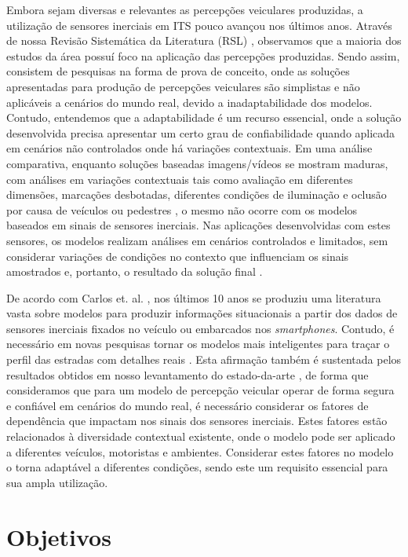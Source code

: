 Embora sejam diversas e relevantes as percepções veiculares produzidas, a utilização de sensores inerciais em ITS pouco avançou nos últimos anos. Através de nossa Revisão Sistemática da Literatura (RSL) \cite{menegazzo2018,menegazzo2020}, observamos que a maioria dos estudos da área possuí foco na aplicação das percepções produzidas. Sendo assim, consistem de pesquisas na forma de prova de conceito, onde as soluções apresentadas para produção de percepções veiculares são simplistas e não aplicáveis a cenários do mundo real, devido a inadaptabilidade dos modelos. Contudo, entendemos que a adaptabilidade é um recurso essencial, onde a solução desenvolvida precisa apresentar um certo grau de confiabilidade quando aplicada em cenários não controlados onde há variações contextuais. Em uma análise comparativa, enquanto soluções baseadas imagens/vídeos se mostram maduras, com análises em variações contextuais tais como avaliação em diferentes dimensões, marcações desbotadas, diferentes condições de iluminação e oclusão por causa de veículos ou pedestres \cite{Srimongkon2017, Patil2020}, o mesmo não ocorre com os modelos baseados em sinais de sensores inerciais. Nas aplicações desenvolvidas com estes sensores, os modelos realizam análises em cenários controlados e limitados, sem considerar variações de condições no contexto que influenciam os sinais amostrados e, portanto, o resultado da solução final \cite{menegazzo2018,menegazzo2020}.

De acordo com Carlos et. al. \cite{Carlos2019}, nos últimos 10 anos se produziu uma literatura vasta sobre modelos para produzir informações situacionais a partir dos dados de sensores inerciais fixados no veículo ou embarcados nos \textit{smartphones}. Contudo, é necessário em novas pesquisas tornar os modelos mais inteligentes para traçar o perfil das estradas com detalhes reais \cite{Carlos2019}. Esta afirmação também é sustentada pelos resultados obtidos em nosso levantamento do estado-da-arte \cite{menegazzo2018,menegazzo2020}, de forma que consideramos que para um modelo de percepção veicular operar de forma segura e confiável em cenários do mundo real, é necessário considerar os fatores de dependência que impactam nos sinais dos sensores inerciais. Estes fatores estão relacionados à diversidade contextual existente, onde o modelo pode ser aplicado a diferentes veículos, motoristas e ambientes. Considerar estes fatores no modelo o torna adaptável a diferentes condições, sendo este um requisito essencial para sua ampla utilização.

\section{Objetivos}

